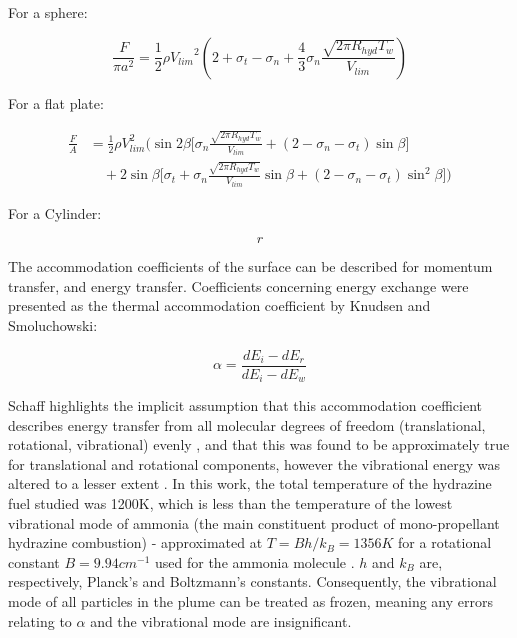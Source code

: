 \documentclass[journal]{new-aiaa}
\begin{document}
For a sphere:

\begin{equation}
    \frac{F}{\pi a^2} = \frac{1}{2} \rho {V_{lim}}^2 \left( 2 + \sigma_t - \sigma_n + \frac{4}{3} \sigma_n \frac{\sqrt{2 \pi R_{hyd} T_w}}{V_{lim}} \right)
\end{equation}


For a flat plate:

\begin{equation}
    \begin{aligned}
        \frac{F}{A} &= \frac{1}{2} \rho {V_{lim}^2} \bigg( \sin{2 \beta} \bigg[ \sigma_n \frac{\sqrt{2 \pi R_{hyd} T_w}}{V_{lim}} 
        + \left(2 - \sigma_n - \sigma_t \right) \sin{\beta} \bigg] \\ 
        &\quad + 2 \sin{\beta} \bigg[ \sigma_t + \sigma_n \frac{\sqrt{2 \pi R_{hyd} T_w}}{V_{lim}} \sin{\beta} 
        + \left(2 - \sigma_n - \sigma_t \right) \sin^2{\beta} \bigg] \bigg)
    \end{aligned}
\end{equation}




For a Cylinder:

\begin{equation}
    r
\end{equation}



The accommodation coefficients of the surface can be described for momentum transfer, and energy transfer. Coefficients concerning energy exchange were presented as the thermal accommodation coefficient by Knudsen and Smoluchowski:

\begin{equation}
    \alpha = \frac{dE_i - dE_r}{dE_i - dE_w}
\end{equation}

Schaff highlights the implicit assumption that this accommodation coefficient describes energy transfer from all molecular degrees of freedom (translational, rotational, vibrational) evenly \cite{chambreFlowRarefiedGases2017}, and that this was found to be approximately true for translational and rotational components, however the vibrational energy was altered to a lesser extent \cite{euckenHandUndJahrbuch1950}. In this work, the total temperature of the hydrazine fuel studied was 1200K, which is less than the temperature of the lowest vibrational mode of ammonia (the main constituent product of mono-propellant hydrazine combustion) - approximated at $T = Bh/k_B = 1356K$ for a rotational constant $B= 9.94 cm^{-1}$ used for the ammonia molecule \cite{hargreavesHOTNH3SPECTRA2011}. $h$ and $k_B$ are, respectively, Planck's and Boltzmann's constants. Consequently, the vibrational mode of all particles in the plume can be treated as frozen, meaning any errors relating to $\alpha$ and the vibrational mode are insignificant.
\end{document}
